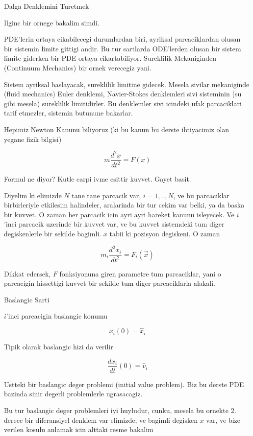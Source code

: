 \documentclass[12pt,fleqn]{article}
\begin{document}
Dalga Denklemini Turetmek 







Ilginc bir ornege bakalim simdi. 

PDE'lerin ortaya cikabilecegi durumlardan biri, ayriksal parcaciklardan
olusan bir sistemin limite gittigi andir. Bu tur sartlarda ODE'lerden
olusan bir sistem limite giderken bir PDE ortaya cikartabiliyor. Sureklilik
Mekaniginden (Continuum Mechanics) bir ornek verecegiz yani.

Sistem ayriksal baslayacak, sureklilik limitine gidecek. Mesela sivilar
mekaniginde (fluid mechanics) Euler denklemi, Navier-Stokes denklemleri
sivi sisteminin (su gibi mesela) sureklilik limitidirler. Bu denklemler
sivi icindeki ufak parcaciklari tarif etmezler, sistemin butunune
bakarlar. 

Hepimiz Newton Kanunu biliyoruz (ki bu kanun bu derste ihtiyacimiz olan
yegane fizik bilgisi)

\[ m \frac{d^2x}{dt^2} = F(x) \]

Formul ne diyor? Kutle carpi ivme esittir kuvvet. Gayet basit.

Diyelim ki elimizde $N$ tane tane parcacik var, $i=1,..,N$, ve bu
parcaciklar birbirleriyle etkilesim halindeler, aralarinda bir tur cekim
var belki, ya da baska bir kuvvet. O zaman her parcacik icin ayri ayri
hareket kanunu isleyecek. Ve $i$'inci parcacik uzerinde bir kuvvet var, ve
bu kuvvet sistemdeki tum diger degiskenlerle bir sekilde bagimli. $x$ tabii
ki pozisyon degiskeni. O zaman

\[ m_i \frac{d^2x_i}{dt^2} = F_i(\vec{x}) \]

Dikkat edersek, $F$ fonksiyonuna giren parametre tum parcaciklar, yani o
parcacigin hissettigi kuvvet bir sekilde tum diger parcaciklarla alakali. 

Baslangic Sarti

$i$'inci parcacigin baslangic konumu

\[ x_i(0) = \hat{x}_i \]

Tipik olarak baslangic hizi da verilir

\[ \frac{dx_i}{dt}(0) = \hat{v}_i \]

Ustteki bir baslangic deger problemi (initial value problem). Biz bu derste
PDE bazinda sinir degerli problemlerle ugrasacagiz. 

Bu tur baslangic deger problemleri iyi huyludur, cunku, mesela bu ornekte
2. derece bir diferansiyel denklem var elimizde, ve bagimli degisken $x$
var, ve bize verilen kosulu anlamak icin alttaki resme bakalim
\end{document}
